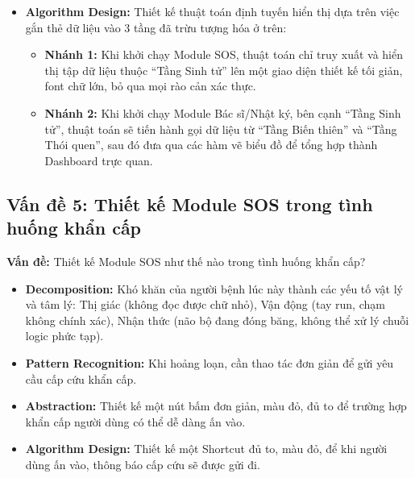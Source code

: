 \documentclass[a4paper,12pt]{article}
\begin{document}
\begin{itemize}
\begin{itemize}
        \item \textbf{Tầng Biến thiên (Xu hướng):} Cung cấp bức tranh y khoa khách quan.
        \item \textbf{Tầng Thói quen (Tâm trạng):} Cung cấp bối cảnh sinh hoạt chủ quan.
    \end{itemize}
    \item \textbf{Algorithm Design:} Thiết kế thuật toán định tuyến hiển thị dựa trên việc gắn thẻ dữ liệu vào 3 tầng đã trừu tượng hóa ở trên:
    \begin{itemize}
        \item \textbf{Nhánh 1:} Khi khởi chạy Module SOS, thuật toán chỉ truy xuất và hiển thị tập dữ liệu thuộc ``Tầng Sinh tử'' lên một giao diện thiết kế tối giản, font chữ lớn, bỏ qua mọi rào cản xác thực.
        \item \textbf{Nhánh 2:} Khi khởi chạy Module Bác sĩ/Nhật ký, bên cạnh ``Tầng Sinh tử'', thuật toán sẽ tiến hành gọi dữ liệu từ ``Tầng Biến thiên'' và ``Tầng Thói quen'', sau đó đưa qua các hàm vẽ biểu đồ để tổng hợp thành Dashboard trực quan.
    \end{itemize}
\end{itemize}

\subsection{Vấn đề 5: Thiết kế Module SOS trong tình huống khẩn cấp}

\textbf{Vấn đề:} Thiết kế Module SOS như thế nào trong tình huống khẩn cấp?

\begin{itemize}
    \item \textbf{Decomposition:} Khó khăn của người bệnh lúc này thành các yếu tố vật lý và tâm lý: Thị giác (không đọc được chữ nhỏ), Vận động (tay run, chạm không chính xác), Nhận thức (não bộ đang đóng băng, không thể xử lý chuỗi logic phức tạp).
    \item \textbf{Pattern Recognition:} Khi hoảng loạn, cần thao tác đơn giản để gửi yêu cầu cấp cứu khẩn cấp.
    \item \textbf{Abstraction:} Thiết kế một nút bấm đơn giản, màu đỏ, đủ to để trường hợp khẩn cấp người dùng có thể dễ dàng ấn vào.
    \item \textbf{Algorithm Design:} Thiết kế một Shortcut đủ to, màu đỏ, để khi người dùng ấn vào, thông báo cấp cứu sẽ được gửi đi.
\end{itemize}
\end{document}
